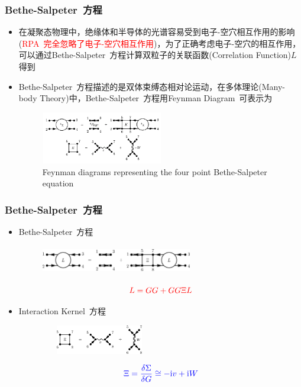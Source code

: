 \documentclass[cjk,slidestop,compress,mathserif,blue]{beamer}
\begin{document}
\frame
{
	\frametitle{\textrm{Bethe-Salpeter~}方程}
	\begin{itemize}
		\item 在凝聚态物理中，绝缘体和半导体的光谱容易受到电子-空穴相互作用的影响(\textcolor{red}{\textrm{RPA~}完全忽略了电子-空穴相互作用})，为了正确考虑电子-空穴的相互作用，可以通过\textrm{Bethe-Salpeter~}方程计算双粒子的关联函数(\textrm{Correlation Function})$L$得到
		\item \textrm{Bethe-Salpeter~}方程描述的是双体束缚态相对论运动，在多体理论(\textrm{Many-body Theory})中，\textrm{Bethe-Salpeter~}方程用\textrm{Feynman Diagram~}可表示为
\begin{figure}[h!]
\centering
\vspace*{-0.1in}
\includegraphics[height=0.9in,width=2.1in,viewport=0 0 650 280,clip]{Figures/BSE_Feynman.png}
\caption{\small \textrm{Feynman diagrams representing the four point Bethe-Salpeter equation}}%
\label{BSE_Feynman}
\end{figure} 
	\end{itemize}
}

\frame
{
	\frametitle{\textrm{Bethe-Salpeter~}方程}
	\begin{itemize}
		\item \textrm{Bethe-Salpeter~}方程
\begin{figure}[h!]
\centering
\vspace*{-0.15in}
\includegraphics[height=0.5in,width=2.6in,viewport=0 0 350 65,clip]{Figures/BS_equation.png}
\label{BSE_Feynman}
\end{figure} 
\begin{displaymath}
	\textcolor{red}{L=GG+GG\Xi L}
\end{displaymath}
		\item \textrm{Interaction Kernel~}方程
\begin{figure}[h!]
\centering
\includegraphics[height=0.5in,width=2.0in,viewport=0 0 250 65,clip]{Figures/K_equation.png}
\label{BSE_Feynman}
\end{figure} 
\begin{displaymath}
	\textcolor{blue}{\Xi=\frac{\delta\Sigma}{\delta G}\cong-\mathrm{i}v+\mathrm{i}W}
\end{displaymath}
	\end{itemize}
}
\end{document}
